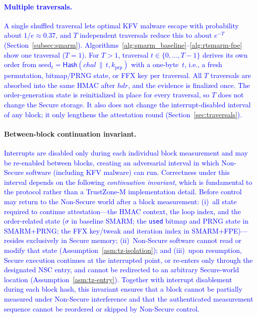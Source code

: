 \documentclass[journal]{IEEEtran}
\newcommand\ben[1]{\textcolor{blue}{#1}}
\newcommand{\rtsmarmone}{SMARM+PRNG\xspace}
\newcommand{\rtsmarmtwo}{SMARM+FPE\xspace}
\begin{document}
\paragraph{\ben{Multiple traversals.}}
\ben{A single shuffled traversal lets optimal KFV malware escape with probability about $1/e \approx 0.37$, and $T$ independent traversals reduce this to about $e^{-T}$~\cite{smarm} (Section~\ref{subsec:smarm}).
Algorithms~\ref{alg:smarm_baseline}--\ref{alg:rtsmarm-fpe} show one traversal ($T = 1$).
For $T > 1$, traversal $t \in \{0,\ldots,T-1\}$ derives its own order from $\text{seed}_t = \mathsf{Hash}(chal \,\|\, t, k_{\mathrm{prp}})$ with a one-byte~$t$, i.e., a fresh permutation, bitmap/PRNG state, or FFX key per traversal.
All $T$ traversals are absorbed into the same HMAC after $\mathit{hdr}$, and the evidence is finalized once.
The order-generation state is reinitialized in place for every traversal, so $T$ does not change the Secure storage.
It also does not change the interrupt-disabled interval of any block; it only lengthens the attestation round (Section~\ref{sec:traversals}).}


\paragraph{Between-block continuation invariant.}
\ben{Interrupts are disabled only during each individual block measurement and may be re-enabled between blocks, creating an adversarial interval in which Non-Secure software (including KFV malware) can run.
Correctness under this interval depends on the following \emph{continuation invariant}, which is fundamental to the protocol rather than a TrustZone-M implementation detail.
Before control may return to the Non-Secure world after a block measurement: (i)~all state required to continue attestation---the HMAC context, the loop index, and the order-related state ($\sigma$ in baseline SMARM; the \texttt{used} bitmap and PRNG state in \rtsmarmone; the FFX key/tweak and iteration index in \rtsmarmtwo)---resides exclusively in Secure memory; (ii)~Non-Secure software cannot read or modify that state (Assumption~\ref{asm:tz-isolation}); and (iii)~upon resumption, Secure execution continues at the interrupted point, or re-enters only through the designated NSC entry, and cannot be redirected to an arbitrary Secure-world location (Assumption~\ref{asm:tz-entry}).
Together with interrupt disablement during each block hash, this invariant ensures that a block cannot be partially measured under Non-Secure interference and that the authenticated measurement sequence cannot be reordered or skipped by Non-Secure control.}
\end{document}
